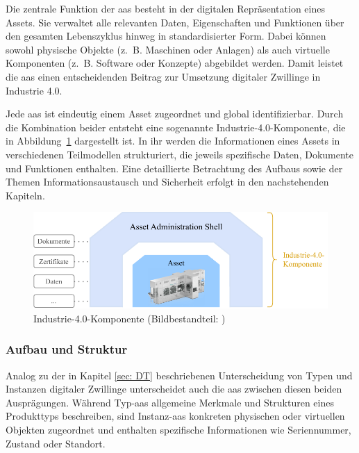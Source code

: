Die zentrale Funktion der \acs{aas} besteht in der digitalen Repräsentation eines Assets. 
Sie verwaltet alle relevanten Daten, Eigenschaften und Funktionen über den gesamten Lebenszyklus hinweg in standardisierter Form. 
Dabei können sowohl physische Objekte (z.~B. Maschinen oder Anlagen) als auch virtuelle Komponenten (z.~B. Software oder Konzepte) abgebildet werden. 
Damit leistet die \acs{aas} einen entscheidenden Beitrag zur Umsetzung digitaler Zwillinge in Industrie 4.0.

Jede \acs{aas} ist eindeutig einem Asset zugeordnet und global identifizierbar. 
Durch die Kombination beider entsteht eine sogenannte Industrie-4.0-Komponente, die in Abbildung~\ref{fig:Industrie4Komponente} dargestellt ist. 
In ihr werden die Informationen eines Assets in verschiedenen Teilmodellen strukturiert, die jeweils spezifische Daten, Dokumente und Funktionen enthalten.
Eine detaillierte Betrachtung des Aufbaus sowie der Themen Informationsaustausch und Sicherheit erfolgt in den nachstehenden Kapiteln.

\vspace{0.25em}
\begin{figure}[htbp]
    \centering
    \includegraphics[width=1\textwidth]{Bilder/I4Komponente/I4KomponenteNeu.pdf}
    \caption[Industrie-4.0-Komponente]{Industrie-4.0-Komponente (Bildbestandteil: \cite{robocellLogo})}
    \label{fig:Industrie4Komponente}
\end{figure}

\subsubsection{Aufbau und Struktur}
Analog zu der in Kapitel \ref{sec: DT} beschriebenen Unterscheidung von Typen und Instanzen digitaler Zwillinge unterscheidet auch die \acs{aas} zwischen diesen beiden Ausprägungen.
Während Typ-\acs{aas} allgemeine Merkmale und Strukturen eines Produkttyps beschreiben, sind Instanz-\acs{aas} konkreten physischen oder virtuellen Objekten zugeordnet und enthalten spezifische Informationen wie Seriennummer, Zustand oder Standort.

